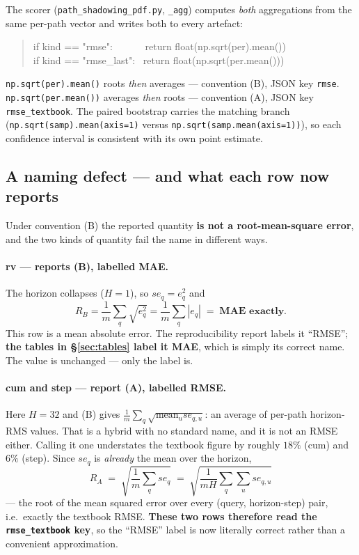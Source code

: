 \documentclass[11pt,a4paper]{article}
\begin{document}
The scorer (\texttt{path\_shadowing\_pdf.py}, \texttt{\_agg}) computes
\emph{both} aggregations from the same per-path vector and writes both to every
artefact:

\begin{quote}\footnotesize\ttfamily
if kind == "rmse": \ \ \ \ \ \ return float(np.sqrt(per).mean()) \\
if kind == "rmse\_last": \ return float(np.sqrt(per.mean()))
\end{quote}

\noindent
\texttt{np.sqrt(per).mean()} roots \emph{then} averages --- convention (B), JSON
key \texttt{rmse}. \texttt{np.sqrt(per.mean())} averages \emph{then} roots ---
convention (A), JSON key \texttt{rmse\_textbook}. The paired bootstrap carries
the matching branch (\texttt{np.sqrt(samp).mean(axis=1)} versus
\texttt{np.sqrt(samp.mean(axis=1))}), so each confidence interval is consistent
with its own point estimate.

\subsection{A naming defect --- and what each row now reports}
\label{sec:switch}

Under convention (B) the reported quantity \textbf{is not a root-mean-square
error}, and the two kinds of quantity fail the name in different ways.

\paragraph{rv --- reports (B), labelled MAE.} The horizon collapses ($H=1$), so
$se_q = e_q^2$ and
\[
R_B=\frac{1}{m}\sum_q \sqrt{e_q^{2}}=\frac{1}{m}\sum_q |e_q| \;=\; \textbf{MAE exactly.}
\]
This row is a mean absolute error. The reproducibility report labels it
``RMSE''; \textbf{the tables in \S\ref{sec:tables} label it MAE}, which is simply
its correct name. The value is unchanged --- only the label is.

\paragraph{cum and step --- report (A), labelled RMSE.} Here $H=32$ and (B)
gives $\frac{1}{m}\sum_q\sqrt{\text{mean}_u se_{q,u}}$: an average of per-path
horizon-RMS values. That is a hybrid with no standard name, and it is not an
RMSE either. Calling it one understates the textbook figure by roughly $18\%$
(cum) and $6\%$ (step). Since $se_q$ is \emph{already} the mean over the horizon,
\[
R_A \;=\; \sqrt{\frac{1}{m}\sum_q se_q}
\;=\; \sqrt{\frac{1}{mH}\sum_{q}\sum_{u} se_{q,u}}
\]
--- the root of the mean squared error over every (query, horizon-step) pair,
i.e.\ exactly the textbook RMSE. \textbf{These two rows therefore read the
\texttt{rmse\_textbook} key}, so the ``RMSE'' label is now literally correct
rather than a convenient approximation.
\end{document}
